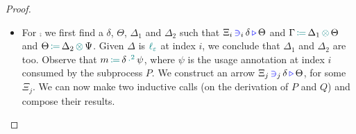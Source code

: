 \begin{proof}[Proof]
\begin{itemize}
    \item
      For $\comp{}{}$ we first find a $\delta$, $\Theta$, $\Delta_1$ and $\Delta_2$ such that $\containsusage{\Xi_i}{i}{\delta}{\Theta}$ and $\opctx{\Gamma}{\Delta_1}{\Theta}$ and $\opctx{\Theta}{\Delta_2}{\Psi}$.
      Given $\Delta$ is $\lz$ at index $i$, we conclude that $\Delta_1$ and $\Delta_2$ are too.
      Observe that $\opsquared{m}{\delta}{\psi}$, where $\psi$ is the usage annotation at index $i$ consumed by the subprocess $P$.
      We construct an arrow $\containsusage{\Xi_j}{j}{\delta}{\Theta}$, for some $\Xi_j$.
      We can now make two inductive calls (on the derivation of $P$ and $Q$) and compose their results.
  \end{itemize}  
\end{proof}